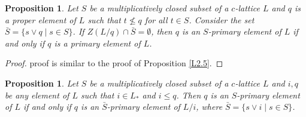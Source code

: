 \documentclass[10pt,twoside,a4paper]{amsart}
\numberwithin{equation}{section}
\theoremstyle{plain}
\newtheorem{prop}[lem]{Proposition}
\theoremstyle{definition}
\begin{document}
\begin{prop}%
	Let $S$ be a multiplicatively closed subset of a $c$-lattice $L$ and $q$ is a proper element of $L$ such that $t \nleq q$ for all  $t\in S$. Consider the set $\bar{S} = \{s \vee q \;|\; s \in S \}$. If $Z(L/q) \cap \bar{S} = \emptyset$, then $q$ is an $S$-primary element of $L$ if and only if  $q$ is  a primary element of $L$.
\end{prop}

\begin{proof} proof is similar to the proof of Proposition \ref{L2.5}.
\end{proof}	

\begin{prop}\label{P3.6} 
	Let $S$ be a multiplicatively closed subset of a $c$-lattice $L$ and $i, q $ be any element of $L$ such that  $i \in L_*$ and $i \leq q$. Then $q$ is an $S$-primary element of $L$ if and only if $q$ is an $\bar{S}$-primary element of $L/i$, where $\bar{S} = \{s \vee i \;|\; s\in S\}$.
\end{prop}
\end{document}
